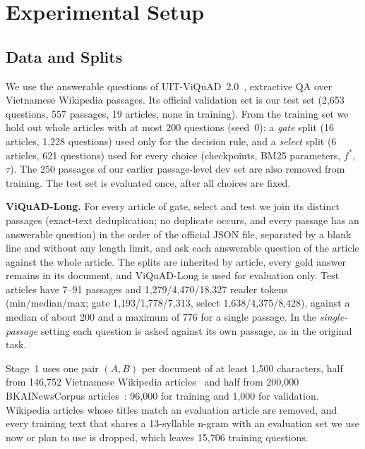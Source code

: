 \section{Experimental Setup}
\label{sec:setup}

\subsection{Data and Splits}
\label{sec:data}
We use the answerable questions of UIT-ViQuAD~2.0~\cite{nguyen2022vlsp}, extractive QA over Vietnamese Wikipedia passages.
Its official validation set is our test set (2,653 questions, 557 passages, 19 articles, none in training).
From the training set we hold out whole articles with at most 200 questions (seed~0): a \emph{gate} split (16 articles, 1,228 questions) used only for the decision rule, and a \emph{select} split (6 articles, 621 questions) used for every choice (checkpoints, BM25 parameters, $f^\ast$, $\tau$).
The 250 passages of our earlier passage-level dev set are also removed from training.
The test set is evaluated once, after all choices are fixed.

\textbf{ViQuAD-Long.}
For every article of gate, select and test we join its distinct passages (exact-text deduplication; no duplicate occurs, and every passage has an answerable question) in the order of the official JSON file, separated by a blank line and without any length limit, and ask each answerable question of the article against the whole article.
The splits are inherited by article, every gold answer remains in its document, and ViQuAD-Long is used for evaluation only.
Test articles have 7--91 passages and 1,279/4,470/18,327 reader tokens (min/median/max; gate 1,193/1,778/7,313, select 1,638/4,375/8,428), against a median of about 200 and a maximum of 776 for a single passage.
In the \emph{single-passage} setting each question is asked against its own passage, as in the original task.

Stage~1 uses one pair $(A, B)$ per document of at least 1,500 characters, half from 146,752 Vietnamese Wikipedia articles~\cite{wikimedia_wiki} and half from 200,000 BKAINewsCorpus articles~\cite{bkai_news}: 96,000 for training and 1,000 for validation.
Wikipedia articles whose titles match an evaluation article are removed, and every training text that shares a 13-syllable n-gram with an evaluation set we use now or plan to use is dropped, which leaves 15,706 training questions.

